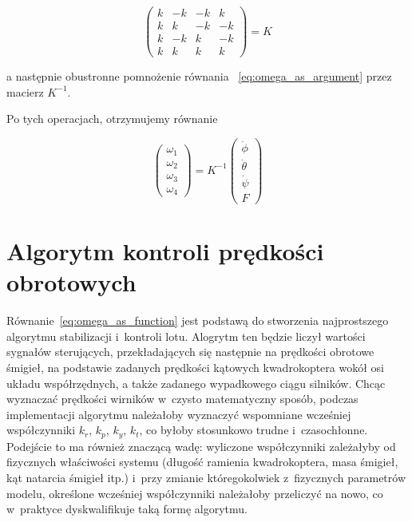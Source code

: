 \begin{equation}
	\begin{pmatrix}
		k & -k & -k & k \\
		k & k & -k & -k \\
		k & -k & k & -k \\
		k & k & k & k
	\end{pmatrix} = K
\end{equation}

a następnie obustronne pomnożenie równania ~\ref{eq:omega_as_argument} przez macierz $K^{-1}$. 

Po tych operacjach, otrzymujemy równanie

\begin{equation}
	\label{eq:omega_as_function}
	\begin{pmatrix}
		\omega_1 \\
		\omega_2 \\
		\omega_3 \\
		\omega_4
	\end{pmatrix} = K^{-1} 
	\begin{pmatrix}
		\dot{\phi} \\
		\dot{\theta} \\
		\dot{\psi} \\
		F
	\end{pmatrix}
\end{equation}

\section{Algorytm kontroli prędkości obrotowych}

Równanie~\ref{eq:omega_as_function} jest podstawą do stworzenia najprostszego algorytmu stabilizacji i~kontroli lotu. Alogrytm ten będzie liczył wartości sygnałów sterujących, przekładających się następnie na prędkości obrotowe śmigieł, na podstawie zadanych prędkości kątowych kwadrokoptera wokół osi układu współrzędnych, a także zadanego wypadkowego ciągu silników. Chcąc wyznaczać prędkości wirników w~czysto matematyczny sposób, podczas implementacji algorytmu należałoby wyznaczyć wspomniane wcześniej współczynniki $k_r$, $k_p$, $k_y$, $k_t$, co byłoby stosunkowo trudne i~czasochłonne. Podejście to ma również znaczącą wadę: wyliczone współczynniki zależałyby od fizycznych właściwości systemu (długość ramienia kwadrokoptera, masa śmigieł, kąt natarcia śmigieł itp.) i~przy zmianie któregokolwiek z~fizycznych parametrów modelu, określone wcześniej współczynniki należałoby przeliczyć na nowo, co w~praktyce dyskwalifikuje taką formę algorytmu. 

